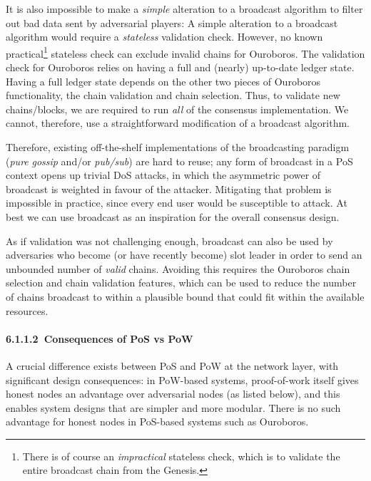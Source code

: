 \documentclass[11pt,a4paper]{article}
\begin{document}
It is also impossible to make a \emph{simple} alteration to a broadcast
algorithm to filter out bad data sent by adversarial players: A simple
alteration to a broadcast algorithm would require a \emph{stateless}
validation check. However, no known practical\footnote{There is of
  course an \emph{impractical} stateless check, which is to validate the
  entire broadcast chain from the Genesis.} stateless check can exclude
invalid chains for Ouroboros. The validation check for Ouroboros relies
on having a full and (nearly) up-to-date ledger state. Having a full
ledger state depends on the other two pieces of Ouroboros functionality,
the chain validation and chain selection. Thus, to validate new
chains/blocks, we are required to run \emph{all} of the consensus
implementation. We cannot, therefore, use a straightforward modification
of a broadcast algorithm.

Therefore, existing off-the-shelf implementations of the broadcasting
paradigm (\emph{pure} \emph{gossip} and/or \emph{pub/sub}) are hard to
reuse; any form of broadcast in a PoS context
\protect\hypertarget{dpbtiakzv0oy}{}{}opens up trivial DoS attacks, in
which the asymmetric power of broadcast is weighted in favour of the
attacker. Mitigating that problem is impossible in practice, since every
end user would be susceptible to attack. At best we can use broadcast as
an inspiration for the overall consensus design.

As if validation was not challenging enough, broadcast can also be used
by adversaries who become (or have recently become) slot leader in order
to send an unbounded number of \emph{valid} chains. Avoiding this
requires the Ouroboros chain selection and chain validation features,
which can be used to reduce the number of chains broadcast to within a
plausible bound that could fit within the available resources.

\hypertarget{consequences-of-pos-vs-pow}{%
\paragraph{​6.1.1.2​~Consequences of PoS vs
PoW}\label{consequences-of-pos-vs-pow}}

A crucial difference exists between PoS and PoW at the network layer,
with significant design consequences: in PoW-based systems,
proof-of-work itself gives honest nodes an advantage over adversarial
nodes (as listed below), and this enables system designs that are
simpler and more modular. There is no such advantage for honest nodes in
PoS-based systems such as Ouroboros.
\end{document}
